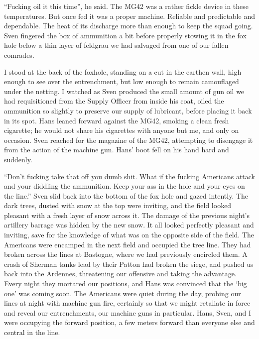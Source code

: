 \documentclass[14pt,a4paper]{memoir}
\begin{document}
“Fucking oil it this time”, he said. The MG42 was a rather fickle device in these temperatures. But once fed it was a proper machine. Reliable and predictable and dependable. The heat of its discharge more than enough to keep the squad going. Sven fingered the box of ammunition a bit before properly stowing it in the fox hole below a thin layer of feldgrau we had salvaged from one of our fallen comrades.

I stood at the back of the foxhole, standing on a cut in the earthen wall, high enough to see over the entrenchment, but low enough to remain camouflaged under the netting. I watched as Sven produced the small amount of gun oil we had requisitioned from the Supply Officer from inside his coat, oiled the ammunition so slightly to preserve our supply of lubricant, before placing it back in its spot. Hans leaned forward against the MG42, smoking a clean fresh cigarette; he would not share his cigarettes with anyone but me, and only on occasion. Sven reached for the magazine of the MG42, attempting to disengage it from the action of the machine gun. Hans’ boot fell on his hand hard and suddenly.

“Don’t fucking take that off you dumb shit. What if the fucking Americans attack and your diddling the ammunition. Keep your ass in the hole and your eyes on the line.” Sven slid back into the bottom of the fox hole and gazed intently. The dark trees, dusted with snow at the top were inviting, and the field looked pleasant with a fresh layer of snow across it. The damage of the previous night’s artillery barrage was hidden by the new snow. It all looked perfectly pleasant and inviting, save for the knowledge of what was on the opposite side of the field. The Americans were encamped in the next field and occupied the tree line. They had broken across the lines at Bastogne, where we had previously encircled them. A crash of Sherman tanks lead by their Patton had broken the siege, and pushed us back into the Ardennes, threatening our offensive and taking the advantage. Every night they mortared our positions, and Hans was convinced that the ‘big one’ was coming soon. The Americans were quiet during the day, probing our lines at night with machine gun fire, certainly so that we might retaliate in force and reveal our entrenchments, our machine guns in particular. Hans, Sven, and I were occupying the forward position, a few meters forward than everyone else and central in the line.
\end{document}
